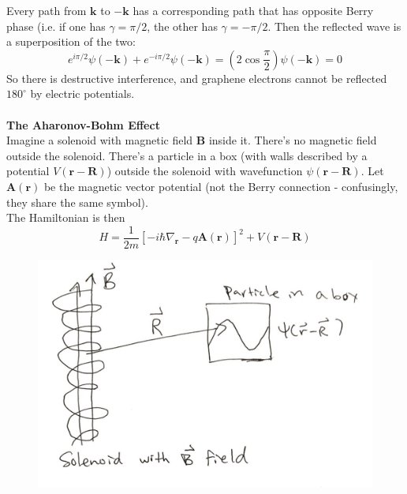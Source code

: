 \documentclass[a4paper,12pt]{article}
\renewcommand{\vec}[1]{\boldsymbol{\mathbf{#1}}}
\begin{document}
Every path from $\vec{k}$ to $-\vec{k}$ has a corresponding path that has opposite Berry phase (i.e. if one has $\gamma=\pi/2$, the other has $\gamma=-\pi/2$.  Then the reflected wave is a superposition of the two:
\begin{equation}
e^{i\pi/2}\psi(-\vec{k})+e^{-i\pi/2}\psi(-\vec{k}) = \left( 2 \cos \frac{\pi}{2} \right) \psi(-\vec{k}) = 0
\end{equation}
So there is destructive interference, and graphene electrons cannot be reflected $180^{\circ}$ by electric potentials.
\\ \\
\textbf{The Aharonov-Bohm Effect} \\
Imagine a solenoid with magnetic field $\vec{B}$ inside it.  There's no magnetic field outside the solenoid.  There's a particle in a box (with walls described by a potential $V(\vec{r}-\vec{R})$) outside the solenoid with wavefunction $\psi(\vec{r}-\vec{R})$. Let $\vec{A}(\vec{r})$ be the magnetic vector potential (not the Berry connection - confusingly, they share the same symbol). \\
The Hamiltonian is then
\begin{equation}
H=\frac{1}{2m} \left[ -i \hbar \nabla_{\vec{r}} - q \vec{A}(\vec{r}) \right]^2 + V(\vec{r}-\vec{R})
\end{equation}
\begin{figure}[h!]
\centering
\includegraphics[width=150mm,keepaspectratio=true]{solenoid.jpg}
\end{figure}
\end{document}

